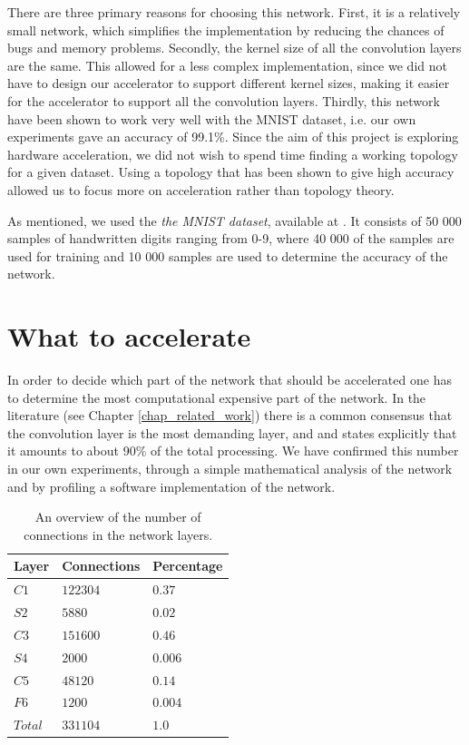 There are three primary reasons for choosing this network. First, it is a relatively small network, which simplifies the implementation by reducing the chances of bugs and memory problems. Secondly, the kernel size of all the convolution layers are the same. This allowed for a less complex implementation, since we did not have to design our accelerator to support different kernel sizes, making it easier for the accelerator to support all the convolution layers. Thirdly, this network have been shown to work very well with the MNIST dataset, i.e. our own experiments gave an accuracy of 99.1\%. Since the aim of this project is exploring hardware acceleration, we did not wish to spend time finding a working topology for a given dataset. Using a topology that has been shown to give high accuracy allowed us to focus more on acceleration rather than topology theory.   

 As mentioned, we used the \textit{the MNIST dataset}, available at \cite{LeCun1998a}. It consists of 50 000 samples of handwritten digits ranging from 0-9, where 40 000 of the samples are used for
training and 10 000 samples are used to determine the accuracy of the network. 

\section{What to accelerate} \label{sec_what_to_accelerate}

In order to decide which part of the network that should be accelerated one has to determine the most computational expensive part of the network. In the literature (see Chapter \ref{chap_related_work}) there is a common consensus that the convolution layer is the most demanding layer, and \cite{Farabet2010} and \cite{Zhang2015} states explicitly that it amounts to about 90\% of the total processing. We have confirmed this number in our own experiments, through a simple mathematical analysis of the network and by profiling a software implementation of the network. 

\begin{table}
	\centering
    \begin{tabular}{| >{\centering\arraybackslash}m{0.8in} | >{\centering\arraybackslash}m{1.0in} | >{\centering\arraybackslash}m{1.0in} |}
    \hline
    Layer & Connections & Percentage  \\ \hline
    $ C1 $ & $ 122304 $ & $ 0.37 $ \\ \hline
    $ S2 $ & $ 5880  $ & $ 0.02 $ \\ \hline
    $ C3 $ & $ 151600 $ & $ 0.46 $  \\ \hline
    $ S4 $ & $ 2000 $ & $ 0.006 $ \\ \hline
    $ C5 $ & $ 48120 $ & $ 0.14 $  \\ \hline
    $ F6 $ & $ 1200 $ & $ 0.004 $ \\ \hline
    $ Total $ & $ 331104 $ & $ 1.0 $  \\ \hline
        \end{tabular}
    \caption{An overview of the number of connections in the network layers.}
   	\label{tab_nofOps}
\end{table}

